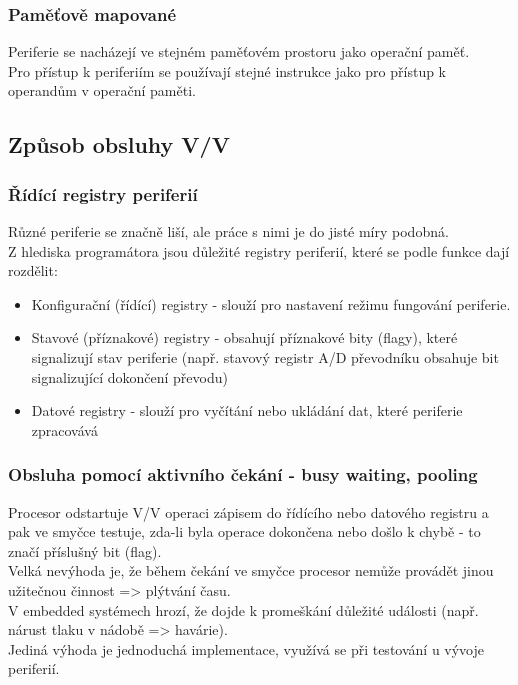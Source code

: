 \subsubsection*{Paměťově mapované}
Periferie se nacházejí ve stejném paměťovém prostoru jako operační paměť. \\
Pro přístup k periferiím se používají stejné instrukce jako pro přístup k operandům v operační paměti.\\
\subsection{Způsob obsluhy V/V}
\subsubsection*{Řídící registry periferií}
Různé periferie se značně liší, ale práce s nimi je do jisté míry podobná.\\
Z hlediska programátora jsou důležité registry periferií, které se podle funkce dají rozdělit:
\begin{itemize}
    \item Konfigurační (řídící) registry - slouží pro nastavení režimu fungování periferie.
    \item Stavové (příznakové) registry - obsahují příznakové bity (flagy), které signalizují stav periferie (např. stavový registr A/D převodníku obsahuje bit signalizující dokončení převodu)
    \item Datové registry - slouží pro vyčítání nebo ukládání dat, které periferie zpracovává
\end{itemize}

\subsubsection*{Obsluha pomocí aktivního čekání - busy waiting, pooling}
Procesor odstartuje V/V operaci zápisem do řídícího nebo datového registru a pak ve smyčce testuje, zda-li byla operace dokončena nebo došlo k chybě - to značí příslušný bit (flag).\\
Velká nevýhoda je, že během čekání ve smyčce procesor nemůže provádět jinou užitečnou činnost => plýtvání času.\\
V embedded systémech hrozí, že dojde k promeškání důležité události (např. nárust tlaku v nádobě => havárie).\\
Jediná výhoda je jednoduchá implementace, využívá se při testování u vývoje periferií.\\

